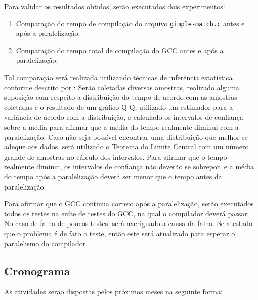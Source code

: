 Para validar os resultados obtidos, serão executados dois experimentos:
\begin{enumerate}
    \item Comparação do tempo de compilação do arquivo \texttt{gimple-match.c}
        antes e após a paralelização.


    \item Comparação do tempo total de compilação do GCC antes e após a paralelização.
\end{enumerate}
Tal comparação será realizada utilizando
técnicas de inferência estatística conforme descrito por
\cite{morettin2017estatistica}: Serão
coletadas diversas amostras, realizado alguma suposição com respeito a distribuição
do tempo de acordo com as amostras coletadas e o resultado de um gráfico Q-Q, utilizado um estimador para a variância
de acordo com a distribuição, e calculado os intervalos de confiança sobre a média
para afirmar que a média do tempo realmente diminui com a paralelização. Caso não
seja possível encontrar uma distribuição que melhor se adeque aos dados, será utilizado
o Teorema do Limite Central com um número grande de amostras no cálculo dos intervalos.
Para afirmar que o tempo realmente diminui, os intervalos de confiança não deverão
se sobrepor, e a média do tempo após a paralelização deverá ser menor que o tempo
antes da paralelização.

Para afirmar que o GCC continua correto após a paralelização, serão executados
todos os testes na suíte de testes do GCC, na qual o compilador deverá passar.
No caso de falha de poucos testes, será averiguado a causa da falha. Se atestado
que o problema é de fato o teste, então este será atualizado para
esperar o paralelismo do compilador.

\subsection{Cronograma}

As atividades serão dispostas pelos próximos meses na seguinte forma:

